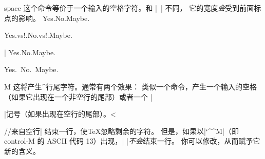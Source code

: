 \begindesc
\cts space {}
\explain
这个命令等价于一个输入的空格字符。和 |\ | \syidxref{\ } 不同，
它的宽度\emph{会}受到前面标点的影响。
\example
Yes.\space No.\space Maybe.\par
Yes.\!vs!.No.\!vs!.Maybe.

|
\produces
Yes.\space No.\space Maybe.\par
Yes.\ No.\ Maybe.
\endexample
\enddesc

%
\begindesc
\ctscaret M 
\explain
这将产生^{行尾}字符。通常有两个效果：
\olist
\li 类似一个命令，产生一个输入的空格（如果它出现在一个非空行的尾部）或者一个
|\par|记号（如果出现在空行的尾部）。^^|\par//来自空行|
\li 结束一行，使\TeX{}忽略剩余的字符。
\endolist
\noindent
但是，如果以|`\^^M|（即 control-M 的 ASCII 代码 13）出现，|^^M|\emph{不会}结束一行。
你可以修改，从而赋予它新的含义。
